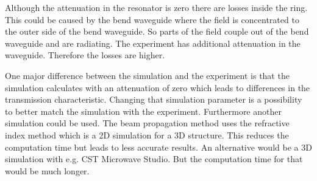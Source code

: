   
Although the attenuation in the resonator is zero there are losses inside the ring. This could be caused by the bend waveguide where the field is concentrated to the outer side of the bend waveguide. So parts of the field couple out of the bend waveguide and are radiating.
The experiment has additional attenuation in the waveguide. Therefore the losses are higher.

\newpage
One major difference between the simulation and the experiment is that the simulation calculates with an attenuation of zero which leads to differences in the transmission characteristic. Changing that simulation parameter is a possibility to better match the simulation with the experiment. 
Furthermore another simulation could be used. The beam propagation method uses the refractive index method which is a 2D simulation for a 3D structure. This reduces the computation time but leads to less accurate results. An alternative would be a 3D simulation with e.g. CST Microwave Studio. But the computation time for that would be much longer. 
